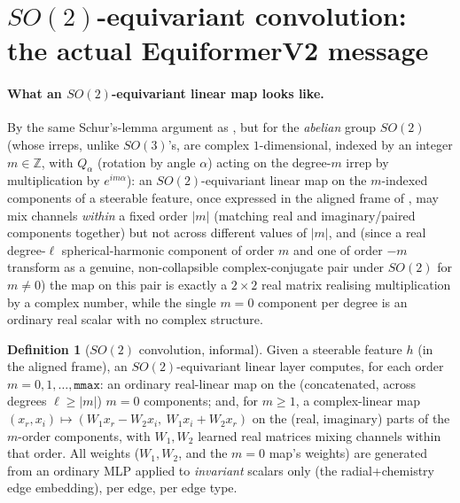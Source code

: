 \documentclass[11pt,a4paper]{report}
\theoremstyle{definition}
\newtheorem{definition}[definition]{Definition}
\theoremstyle{remark}
\newcommand{\ZZ}{\mathbb Z}
\begin{document}
\section{$SO(2)$-equivariant convolution: the actual EquiformerV2 message}
\label{sec:so2-conv}

\paragraph{What an $SO(2)$-equivariant linear map looks like.} By the same
Schur's-lemma argument as , but for the
\emph{abelian} group $SO(2)$ (whose irreps, unlike $SO(3)$'s, are complex
$1$-dimensional, indexed by an integer $m\in\ZZ$, with $Q_\alpha$ (rotation
by angle $\alpha$) acting on the degree-$m$ irrep by multiplication by
$e^{im\alpha}$): an $SO(2)$-equivariant linear map on the $m$-indexed
components of a steerable feature, once expressed in the aligned frame of
, may mix channels \emph{within} a fixed order
$|m|$ (matching real and imaginary/paired components together) but not
across different values of $|m|$, and (since a real degree-$\ell$
spherical-harmonic component of order $m$ and one of order $-m$ transform
as a genuine, non-collapsible complex-conjugate pair under $SO(2)$ for
$m\ne0$) the map on this pair is exactly a $2\times2$ real matrix realising
multiplication by a complex number, while the single $m=0$ component per
degree is an ordinary real scalar with no complex structure.

\begin{definition}[$SO(2)$ convolution, informal]
\label{def:so2-conv}
Given a steerable feature $h$ (in the aligned frame), an $SO(2)$-equivariant
linear layer computes, for each order $m=0,1,\dots,\texttt{mmax}$: an
ordinary real-linear map on the (concatenated, across degrees $\ell\ge|m|$)
$m=0$ components; and, for $m\ge1$, a complex-linear map
$(x_r,x_i)\mapsto(W_1x_r-W_2x_i,\ W_1x_i+W_2x_r)$ on the (real, imaginary)
parts of the $m$-order components, with $W_1,W_2$ learned real matrices
mixing channels within that order. All weights ($W_1,W_2$, and the $m=0$
map's weights) are generated from an ordinary MLP applied to
\emph{invariant} scalars only (the radial+chemistry edge embedding), per
edge, per edge type.
\end{definition}
\end{document}
